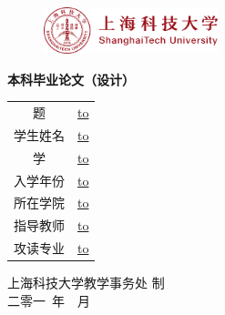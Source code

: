 \thispagestyle{titlepage}

\begin{figure}[!htb]
\includegraphics[width=0.45\textwidth]{style-files/emblem.pdf}
\end{figure}

\begin{CJK}{UTF8}{gbsn}

\vspace{3cm}
\begin{center}
\Huge\sffamily\textbf{本科毕业论文（设计）}
\end{center}
\vfill

\vspace{3cm}
\begin{center}
{\def\arraystretch{1.5}
\makeatletter
  \begin{tabular}{Mc}
  题\quad{} &
  \underline{\hbox to \@metaBlankLen{\hfill\@titleZh\hfill}} \\
  学生姓名 &
  \underline{\hbox to \@metaBlankLen{\hfill\@studentNameZh\hfill}} \\
  学\quad{} &
  \underline{\hbox to \@metaBlankLen{\hfill\@studentId\hfill}} \\
  入学年份 &
  \underline{\hbox to } \\
  所在学院 &
  \underline{\hbox to \@metaBlankLen{\hfill\@departmentNameZh\hfill}} \\
  指导教师 &
  \underline{\hbox to \@metaBlankLen{\hfill\@advisorNameZh\hfill}} \\
  攻读专业 &
  \underline{\hbox to \@metaBlankLen{\hfill\@majorNameZh\hfill}} \\
\end{tabular}
\makeatother}
\end{center}

\vfill

\begin{center}
上海科技大学教学事务处 制\\
二零一\quad~年~\quad~月
\end{center}

\end{CJK}

\clearpage